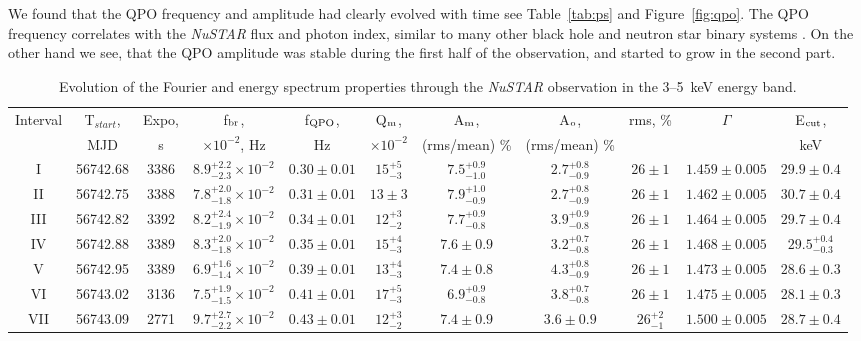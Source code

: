 \documentclass[a4paper,fleqn,usenatbib]{mnras}
\begin{document}
We found that the QPO frequency and amplitude had clearly evolved with time see Table~\ref{tab:ps} and Figure~\ref{fig:qpo}.
The QPO frequency correlates with the {\it NuSTAR} flux and photon index, similar to many other black hole and neutron star binary systems \citep[see, e.g.,][]{2003A&A...397..729V,2003A&A...407.1039P}.
On the other hand we see, that the QPO amplitude was stable during the first half of the observation, and started to grow in the second part.

\begin{table}
\noindent
\centering
\caption{Evolution of the Fourier and energy spectrum properties through the {\it NuSTAR} observation in the 3--5~keV energy band.}
\label{tab:timing}
\centering
\begin{tabular}{|c|c|c|c|c|c|c|c|c|c|c|}
\hline\hline
Interval & T$_{start}$, & Expo,  & f$_{\rm br}$, & f$_{\rm QPO}$, & Q$_{\rm m}$, & A$_{\rm m}$, & A$_{\rm o}$,& rms, \% & $\Gamma$ & E$_{\rm cut}$, \\
            &  MJD &  s & $\times10^{-2}$, Hz &  Hz & $\times10^{-2}$ & (rms/mean) \% &  (rms/mean) \%   &  & &  keV \\
\hline
I & 56742.68 & 3386 & $8.9_{-2.3}^{+2.2}\times10^{-2}$ & $0.30\pm0.01$ & $15_{-3}^{+5}$ & $7.5_{-1.0}^{+0.9}$ & $2.7_{-0.9}^{+0.8}$ & $26\pm1$ & $1.459\pm0.005$ & $29.9\pm0.4$ & \\
II & 56742.75 & 3388 & $7.8_{-1.8}^{+2.0}\times10^{-2}$ & $0.31\pm0.01$ & $13\pm3$ & $7.9_{-0.9}^{+1.0}$ & $2.7_{-0.9}^{+0.8}$ & $26\pm1$ & $1.462\pm0.005$ & $30.7\pm0.4$ & \\
III & 56742.82 & 3392 & $8.2_{-1.9}^{+2.4}\times10^{-2}$ & $0.34\pm0.01$ & $12_{-2}^{+3}$ & $7.7_{-0.8}^{+0.9}$ & $3.9_{-0.8}^{+0.9}$ & $26\pm1$ & $1.464\pm0.005$ & $29.7\pm0.4$ & \\
IV & 56742.88 & 3389 & $8.3_{-1.8}^{+2.0}\times10^{-2}$ & $0.35\pm0.01$ & $15_{-3}^{+4}$ & $7.6\pm0.9$ & $3.2_{-0.8}^{+0.7}$ & $26\pm1$ & $1.468\pm0.005$ & $29.5_{-0.3}^{+0.4}$ & \\
V & 56742.95 & 3389 & $6.9_{-1.4}^{+1.6}\times10^{-2}$ & $0.39\pm0.01$ & $13_{-3}^{+4}$ & $7.4\pm0.8$ & $4.3_{-0.9}^{+0.8}$ & $26\pm1$ & $1.473\pm0.005$ & $28.6\pm0.3$ & \\
VI & 56743.02 & 3136 & $7.5_{-1.5}^{+1.9}\times10^{-2}$ & $0.41\pm0.01$ & $17_{-3}^{+5}$ & $6.9_{-0.8}^{+0.9}$ & $3.8_{-0.8}^{+0.7}$ & $26\pm1$ & $1.475\pm0.005$ & $28.1\pm0.3$ & \\
VII & 56743.09 & 2771 & $9.7_{-2.2}^{+2.7}\times10^{-2}$ & $0.43\pm0.01$ & $12_{-2}^{+3}$ & $7.4\pm0.9$ & $3.6\pm0.9$ & $26_{-1}^{+2}$ & $1.500\pm0.005$ & $28.7\pm0.4$ & \\

\end{tabular}
\end{table}
\end{document}
